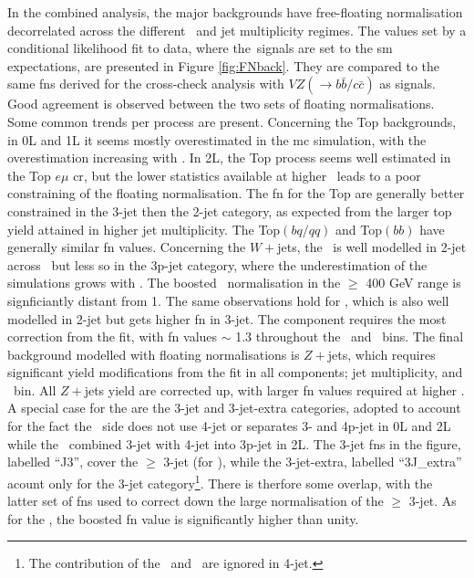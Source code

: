 In the combined analysis, the major backgrounds have free-floating normalisation decorrelated across the different \ptv\ and jet multiplicity regimes. The values set by a conditional likelihood fit to data, where the\vhbc\ signals are set to the \gls{sm} expectations, are presented in Figure \ref{fig:FNback}. They are compared to the same \gls{fn}s derived for the cross-check analysis with $VZ(\rightarrow b\bar{b}/c\bar{c})$ as signals. Good agreement is observed between the two sets of floating normalisations. Some common trends per process are present. Concerning the Top backgrounds, in 0L and 1L it seems mostly overestimated in the \gls{mc} simulation, with the overestimation increasing with \ptv. In 2L, the Top process seems well estimated in the Top $e\mu$ \gls{cr}, but the lower statistics available at higher \ptv\ leads to a poor constraining of the floating normalisation. The \gls{fn} for the Top are generally better constrained in the 3-jet then the 2-jet category, as expected from the larger top yield attained in higher jet multiplicity. The Top$(bq/qq)$ and Top$(bb)$ have generally similar \gls{fn} values. Concerning the $W+$jets, the \whf\ is well modelled in 2-jet across \ptv\ but less so in the 3p-jet category, where the underestimation of the simulations grows with \ptv. The boosted \whf\ normalisation in the $\geq$ 400 GeV range is signficiantly distant from 1. The same observations hold for \wlf, which is also well modelled in 2-jet but gets higher \gls{fn} in 3-jet. The \wmf component requires the most correction from the fit, with \gls{fn} values $\sim$ 1.3 throughout the \nj\ and \ptv\ bins. The final background modelled with floating normalisations is $Z+$jets, which requires significant yield modifications from the fit in all components; jet multiplicity, and \ptv\ bin. All $Z+$jets yield are corrected up, with larger \gls{fn} values required at higher \ptv. A special case for the \zhf are the 3-jet and 3-jet-extra categories, adopted to account for the fact the \vhc\ side does not use 4-jet or separates 3- and 4p-jet in 0L and 2L while the \vhb\ combined 3-jet with 4-jet into 3p-jet in 2L. The 3-jet \gls{fn}s in the figure, labelled ``J3'', cover the $\geq$ 3-jet (for \vhb), while the 3-jet-extra, labelled ``3J\_extra'' acount only for the 3-jet category\footnote{The contribution of the \zmf\ and \zlf\ are ignored in 4-jet.}. There is therfore some overlap, with the latter set of \gls{fn}s used to correct down the large normalisation of the $\geq$ 3-jet. As for the \whf, the boosted \zhf \gls{fn} value is significantly higher than unity.

